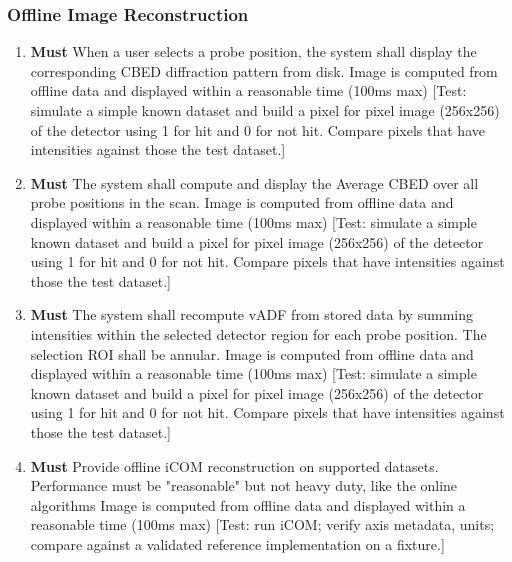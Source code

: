 \documentclass[12pt]{article}
\newcommand{\PriorityTag}[2]{%
  \colorbox{#2!25}{\footnotesize\textsf{\textbf{#1}}}\hspace{0.6em}}
\newcommand{\must}{\leavevmode\PriorityTag{Must}{green}}
\newcounter{reqgrp}[section] %
\newcounter{reqno}
\newcommand{\reqprefix}{GEN}
\newenvironment{requirements}[1]{%
  \renewcommand{\reqprefix}{#1}%
  \refstepcounter{reqgrp}%
  \setcounter{reqno}{0}%
  \begin{enumerate}[leftmargin=*]
}{\end{enumerate}}
\begin{document}
\subsubsection{Offline Image Reconstruction}
\begin{requirements}{OFR}

\item \must {}
  {When a user selects a probe position, the system shall display the corresponding CBED diffraction pattern from disk.}
  {Image is computed from offline data and displayed within a reasonable time (100ms max)}
  [Test: simulate a simple known dataset and build a pixel for pixel image (256x256) of the detector using 1 for hit and 0 for not hit. Compare pixels that have intensities against those the test dataset.]

\item \must {}
  {The system shall compute and display the Average CBED over all probe positions in the scan.}
  {Image is computed from offline data and displayed within a reasonable time (100ms max)}
  [Test: simulate a simple known dataset and build a pixel for pixel image (256x256) of the detector using 1 for hit and 0 for not hit. Compare pixels that have intensities against those the test dataset.]

\item \must {}
  {The system shall recompute vADF from stored data by summing intensities within the selected detector region for each probe position. The selection ROI shall be annular.}
  {Image is computed from offline data and displayed within a reasonable time (100ms max)}
  [Test: simulate a simple known dataset and build a pixel for pixel image (256x256) of the detector using 1 for hit and 0 for not hit. Compare pixels that have intensities against those the test dataset.]

\item \must {}
  {Provide offline iCOM reconstruction on supported datasets. Performance must be "reasonable" but not heavy duty, like the online algorithms}
  {Image is computed from offline data and displayed within a reasonable time (100ms max)}
  [Test: run iCOM; verify axis metadata, units; compare against a validated reference implementation on a fixture.]


\end{requirements}
\end{document}
